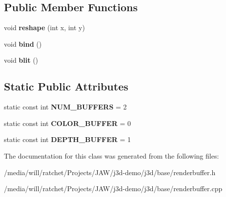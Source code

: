 \subsection*{Public Member Functions}
\begin{DoxyCompactItemize}
\item 
\hypertarget{classj3d_1_1base_1_1Renderbuffer_a0cac34555f49c7c11f0c6fdc6d561e6c}{}void {\bfseries reshape} (int x, int y)\label{classj3d_1_1base_1_1Renderbuffer_a0cac34555f49c7c11f0c6fdc6d561e6c}

\item 
\hypertarget{classj3d_1_1base_1_1Renderbuffer_a337ccff301db4504b3a44a60ade88fe5}{}void {\bfseries bind} ()\label{classj3d_1_1base_1_1Renderbuffer_a337ccff301db4504b3a44a60ade88fe5}

\item 
\hypertarget{classj3d_1_1base_1_1Renderbuffer_a20fe4f3f3d794323d0feceeb9f49f178}{}void {\bfseries blit} ()\label{classj3d_1_1base_1_1Renderbuffer_a20fe4f3f3d794323d0feceeb9f49f178}

\end{DoxyCompactItemize}
\subsection*{Static Public Attributes}
\begin{DoxyCompactItemize}
\item 
\hypertarget{classj3d_1_1base_1_1Renderbuffer_a89ddb3deee083d573fb02d7da3c1baa4}{}static const int {\bfseries N\+U\+M\+\_\+\+B\+U\+F\+F\+E\+R\+S} = 2\label{classj3d_1_1base_1_1Renderbuffer_a89ddb3deee083d573fb02d7da3c1baa4}

\item 
\hypertarget{classj3d_1_1base_1_1Renderbuffer_abfeb2086204c39280423a71f770a5992}{}static const int {\bfseries C\+O\+L\+O\+R\+\_\+\+B\+U\+F\+F\+E\+R} = 0\label{classj3d_1_1base_1_1Renderbuffer_abfeb2086204c39280423a71f770a5992}

\item 
\hypertarget{classj3d_1_1base_1_1Renderbuffer_a54526410287ad7f79aed589f9c9f7dcb}{}static const int {\bfseries D\+E\+P\+T\+H\+\_\+\+B\+U\+F\+F\+E\+R} = 1\label{classj3d_1_1base_1_1Renderbuffer_a54526410287ad7f79aed589f9c9f7dcb}

\end{DoxyCompactItemize}


The documentation for this class was generated from the following files\+:\begin{DoxyCompactItemize}
\item 
/media/will/ratchet/\+Projects/\+J\+A\+W/j3d-\/demo/j3d/base/renderbuffer.\+h\item 
/media/will/ratchet/\+Projects/\+J\+A\+W/j3d-\/demo/j3d/base/renderbuffer.\+cpp\end{DoxyCompactItemize}
